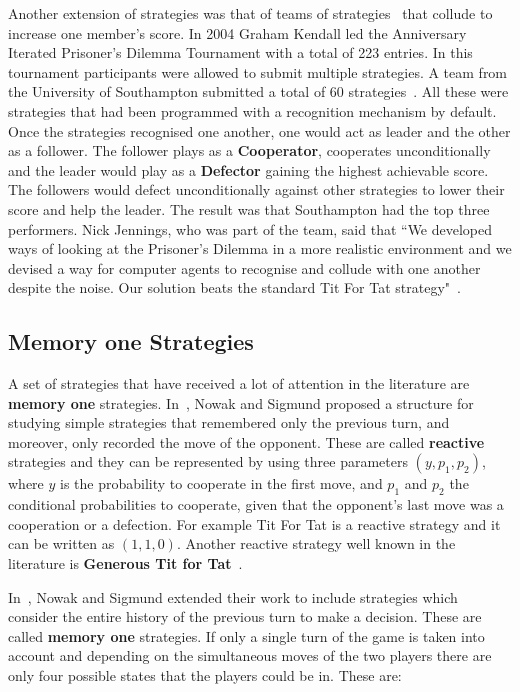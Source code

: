 Another extension of strategies was that of teams of
strategies~\cite{J.P.Delahaye1993Lp, J.P.Delahaye1995LIeP, A.Rogers2007Ctpw}
that collude to increase one member's score. In 2004 Graham Kendall led the
Anniversary Iterated Prisoner's Dilemma Tournament with a total of 223 entries.
In this tournament participants were allowed to submit multiple strategies. A
team from the University of Southampton submitted a total of 60
strategies~\cite{A.Rogers2007Ctpw}. All these were strategies that had been
programmed with a recognition mechanism by default. Once the strategies
recognised one another, one would act as leader and the other as a follower. The
follower plays as a \textbf{Cooperator}, cooperates unconditionally and the
leader would play as a \textbf{Defector} gaining the highest achievable score.
The followers would defect unconditionally against other strategies to lower
their score and help the leader. The result was that Southampton had the top
three performers. Nick Jennings, who was part of the team, said that ``We
developed ways of looking at the Prisoner's Dilemma in a more realistic
environment and we devised a way for computer agents to recognise and collude
with one another despite the noise. Our solution beats the standard Tit For Tat
strategy"~\cite{southampton_blog}.

\subsection{Memory one Strategies}\label{section:memory_one}

A set of strategies that have received a lot of attention in
the literature are \textbf{memory one} strategies. In~\cite{Nowak1989},
Nowak and Sigmund proposed a structure for studying simple strategies that
remembered only the previous turn, and moreover, only recorded the move of the
opponent. These are called \textbf{reactive} strategies and they can be
represented by using three parameters \((y, p_1, p_2)\), where \(y\) is the
probability to cooperate in the first move, and \(p_1\) and \(p_2\) the
conditional probabilities to cooperate, given that the opponent's last move was
a cooperation or a defection. For example Tit For Tat is a reactive strategy and
it can be written as \((1, 1, 0)\). Another reactive strategy well known in
the literature is \textbf{Generous Tit for Tat}~\cite{Nowak1992}.

In~\cite{Nowak1990}, Nowak and Sigmund extended
their work to include strategies which consider the entire history of the previous turn to make a decision.
These are called \textbf{memory one} strategies.
If only a single turn of the game is taken into account and depending on the
simultaneous moves of the two players there are only four possible states that
the players could be in. These are:

